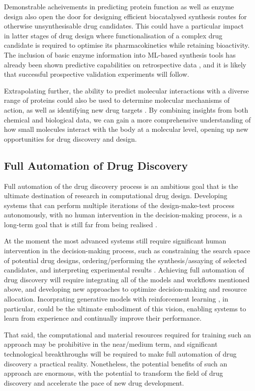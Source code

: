 Demonstrable acheivements in predicting protein function \cite{Bileschi2022ProteinAnnotation} as well as enzyme design \cite{Yeh2023DeNovoLuciferase} also open the door for designing efficient biocatalysed synthesis routes for otherwise unsynthesisable drug candidates. This could have a particular impact in latter stages of drug design where functionalisation of a complex drug candidate is required to optimise its pharmacokinetics while retaining bioactivity. The inclusion of basic enzyme information into ML-based synthesis tools has already been shown predictive capabilities on retrospective data \cite{Probst2022Biocatalysis}, and it is likely that successful prospective validation experiments will follow.

Extrapolating further, the ability to predict molecular interactions with a diverse range of proteins could also be used to determine molecular mechanisms of action, as well as identifying new drug targets \cite{Schenone2013TargetID}. By combining insights from both chemical and biological data, we can gain a more comprehensive understanding of how small molecules interact with the body at a molecular level, opening up new opportunities for drug discovery and design.

\subsection{Full Automation of Drug Discovery}
Full automation of the drug discovery process is an ambitious goal that is the ultimate destination of research in computational drug design. Developing systems that can perform multiple iterations of the design-make-test process autonomously, with no human intervention in the decision-making process, is a long-term goal that is still far from being realised \cite{Coley2019AutonomousProgress,Coley2019AutonomousOutlook, Schneider2018AutomatingDrugDiscovery}.

At the moment the most advanced systems still require significant human intervention in the decision-making process, such as constraining the search space of potential drug designs, ordering/performing the synthesis/assaying of selected candidates, and interpreting experimental results \cite{Goldman2022ChemicalDesignLevels}. Achieving full automation of drug discovery will require integrating all of the models and workflows mentioned above, and developing new approaches to optimize decision-making and resource allocation. Incorprating generative models with reinforcement learning \cite{Popova2018DeepRL, Zhou2019Optimization, born2019paccmannrl Chenthamarakshan2022IBMGenCoV}, in particular, could be the ultimate embodiment of this vision, enabling systems to learn from experience and continually improve their performance.

That said, the computational and material resources required for training such an approach may be prohibitive in the near/medium term, and significant technological breakthroughs will be required to make full automation of drug discovery a practical reality. Nonetheless, the potential benefits of such an approach are enormous, with the potential to transform the field of drug discovery and accelerate the pace of new drug development.
